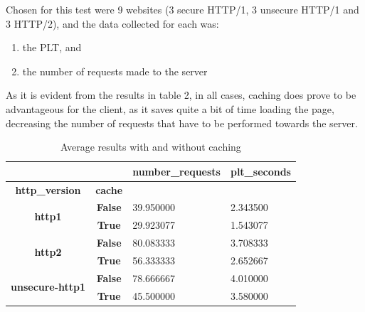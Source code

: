 \documentclass[a4paper,10pt]{article}
\begin{document}
Chosen for this test were 9 websites (3 secure HTTP/1, 3 unsecure HTTP/1 and 3 HTTP/2), and the data collected for each was: 


\begin{enumerate}

\item the PLT, and
\item the number of requests made to the server

\end{enumerate}

As it is evident from the results in table 2, in all cases, caching does prove to be advantageous for the client, as it saves quite a bit of time loading the page, decreasing the number of requests that have to be performed towards the server.

\begin{table}[h!]
\centering
\begin{tabular}{|c|c|l|l|}
\hline
\multicolumn{1}{|r|}{\textbf{}}          & \multicolumn{1}{r|}{\textbf{}} & \multicolumn{1}{r|}{\textbf{number\_requests}} & \multicolumn{1}{r|}{\textbf{plt\_seconds}} \\ \hline
\textbf{http\_version}                   & \textbf{cache}                 & \multicolumn{1}{c|}{\textbf{}}                 & \multicolumn{1}{c|}{\textbf{}}             \\ \hline
\multirow{2}{*}{\textbf{http1}}          & \textbf{False}                 & 39.950000                                      & 2.343500                                   \\ \cline{2-4} 
                                         & \textbf{True}                  & 29.923077                                      & 1.543077                                   \\ \hline
\multirow{2}{*}{\textbf{http2}}          & \textbf{False}                 & 80.083333                                      & 3.708333                                   \\ \cline{2-4} 
                                         & \textbf{True}                  & 56.333333                                      & 2.652667                                   \\ \hline
\multirow{2}{*}{\textbf{unsecure-http1}} & \textbf{False}                 & 78.666667                                      & 4.010000                                   \\ \cline{2-4} 
                                         & \textbf{True}                  & 45.500000                                      & 3.580000                                   \\ \hline
\end{tabular}

\caption{Average results with and without caching}
\label{fig:table2}
\end{table}
\end{document}
